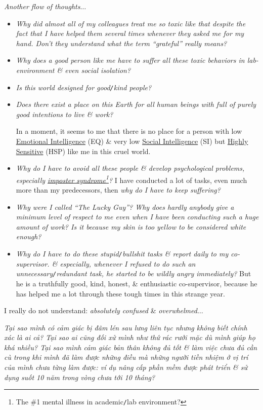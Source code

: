 \documentclass[12pt]{article}
\begin{document}
\noindent
{} {\it Another flow of thoughts}$\ldots$
\begin{itemize}
	\setlength\itemsep{0em}
	\item {\it Why did almost all of my colleagues treat me so toxic like that despite the fact that I have helped them several times whenever they asked me for my hand. Don't they understand what the term ``grateful'' really means?}
	\item {\it Why does a good person like me have to suffer all these toxic behaviors in lab-environment \& even social isolation?}
	\item {\it Is this world designed for good{\tt/}kind people?}
	\item {\it Does there exist a place on this Earth for all human beings with full of purely good intentions to live \& work?}
	
	In a moment, it seems to me that there is no place for a person with low \href{https://en.wikipedia.org/wiki/Emotional_intelligence}{Emotional Intelligence} (EQ) \& very low \href{https://en.wikipedia.org/wiki/Social_intelligence}{Social Intelligence} (SI) but \href{https://hsperson.com/}{Highly Sensitive} (HSP) like me in this cruel world.    
	\item {\it Why do I have to avoid all these people \& develop psychological problems, especially \href{https://en.wikipedia.org/wiki/Impostor_syndrome}{imposter syndrome}\footnote{The \#1 mental illness in academic{\tt/}lab environment?}?} I have conducted a lot of tasks, even much more than my predecessors, then {\it why do I have to keep suffering?}
	\item {\it Why were I called ``The Lucky Guy''? Why does hardly anybody give a minimum level of respect to me even when I have been conducting such a huge amount of work? Is it because my skin is too yellow to be considered white enough?}
	\item {\it Why do I have to do these stupid{\tt/}bullshit tasks \& report daily to my co-supervisor. \& especially, whenever I refused to do such an unnecessary{\tt/}redundant task, he started to be wildly angry immediately?} But he is a truthfully good, kind, honest, \& enthusiastic co-supervisor, because he has helped me a lot through these tough times in this strange year.
\end{itemize}
I really do not understand: {\it absolutely confused} \& {\it overwhelmed}$\ldots$

{\it Tại sao mình có cảm giác bị đâm lén sau lưng liên tục nhưng không biết chính xác là ai cả? Tại sao ai cũng đối xử mình như thứ rác rưởi mặc dù mình giúp họ khá nhiều? Tại sao mình cảm giác bản thân không đủ tốt \& làm việc chưa đủ cần cù trong khi mình đã làm được những điều mà những người tiền nhiệm ở vị trí của mình chưa từng làm được: ví dụ nâng cấp phần mềm được phát triển \& sử dụng suốt 10 năm trong vòng chưa tới 10 tháng?}
\end{document}
